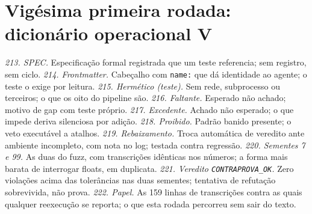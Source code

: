 \section{Vigésima primeira rodada: dicionário operacional V}
\textit{213. SPEC.} Especificação formal registrada que um teste referencia; sem registro, sem ciclo.
\textit{214. Frontmatter.} Cabeçalho com \texttt{name:} que dá identidade ao agente; o teste o exige por leitura.
\textit{215. Hermético (teste).} Sem rede, subprocesso ou terceiros; o que os oito do pipeline são.
\textit{216. Faltante.} Esperado não achado; motivo de gap com teste próprio.
\textit{217. Excedente.} Achado não esperado; o que impede deriva silenciosa por adição.
\textit{218. Proibido.} Padrão banido presente; o veto executável a atalhos.
\textit{219. Rebaixamento.} Troca automática de veredito ante ambiente incompleto, com nota no log; testada contra regressão.
\textit{220. Sementes 7 e 99.} As duas do fuzz, com transcrições idênticas nos números; a forma mais barata de interrogar floats, em duplicata.
\textit{221. Veredito \texttt{CONTRAPROVA\_OK}.} Zero violações acima das tolerâncias nas duas sementes; tentativa de refutação sobrevivida, não prova.
\textit{222. Papel.} As 159 linhas de transcrições contra as quais qualquer reexecução se reporta; o que esta rodada percorreu sem sair do texto.
